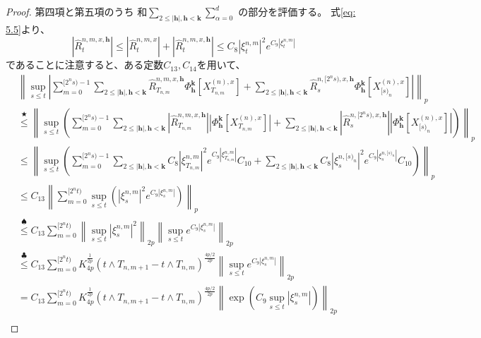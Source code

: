 \documentclass[uplatex]{jsarticle}
\theoremstyle{definition}
\begin{document}
\begin{proof}
  第四項と第五項のうち
  和\(\sum_{2\leq |\mathbf{h}| , \mathbf{h} < \mathbf{k}}\sum_{\alpha=0}^d\)
  の部分を評価する。
  式\eqref{eq: 5.5}より、
  \[
  |\hat{R}_t^{n,m,x,\mathbf{h}}| \leq
  |\hat{R}_t^{n,m,x}| + |\hat{R}_t^{n,m,x,\mathbf{h}}| \leq
  C_8|\xi_t^{n,m}|^2e^{C_9|\xi_t^{n,m}|}
  \]
  であることに注意すると、ある定数\(C_{13},C_{14}\)を用いて、
  \begin{align*}
    &\left\| \sup_{s\leq t}
    \left| \sum_{m=0}^{[2^ns)-1}\sum_{2 \leq |\mathbf{h}| , \mathbf{h} < \mathbf{k}}
    \hat{R}_{T_{n,m}}^{n,m,x,\mathbf{h}}
    \Phi_{\mathbf{h}}^{\mathbf{k}}\left[ X_{T_{n,m}}^{(n),x}\right]
    + \sum_{2 \leq |\mathbf{h}| , \mathbf{h} < \mathbf{k}}
    \hat{R}_s^{n,[2^ns),x,\mathbf{h}}
    \Phi_{\mathbf{h}}^{\mathbf{k}}\left[ X_{[s)_n}^{(n),x}\right]
    \right| \right\|_p \\
    &\overset{\bigstar}{\leq} \left\| \sup_{s\leq t} \left(
    \sum_{m=0}^{[2^ns)-1}\sum_{2 \leq |\mathbf{h}| , \mathbf{h} < \mathbf{k}}
    \left| \hat{R}_{T_{n,m}}^{n,m,x,\mathbf{h}}\right|
    \left|
    \Phi_{\mathbf{h}}^{\mathbf{k}}\left[ X_{T_{n,m}}^{(n),x}\right]
    \right|
    + \sum_{2 \leq |\mathbf{h}| , \mathbf{h} < \mathbf{k}}
    \left| \hat{R}_s^{n,[2^ns),x,\mathbf{h}}\right|
    \left|
    \Phi_{\mathbf{h}}^{\mathbf{k}}\left[ X_{[s)_n}^{(n),x}\right]
    \right| \right) \right\|_p \\
    &\leq \left\| \sup_{s\leq t}\left(
    \sum_{m=0}^{[2^ns)-1}\sum_{2 \leq |\mathbf{h}| , \mathbf{h} < \mathbf{k}}
    C_8|\xi_{T_{n,m}}^{n,m}|^2e^{C_9|\xi_{T_{n,m}}^{n,m}|} C_{10}
    + \sum_{2 \leq |\mathbf{h}| , \mathbf{h} < \mathbf{k}}
    C_8|\xi_s^{n,[s)_n}|^2e^{C_9|\xi_s^{n,[s)_n}|} C_{10}
    \right) \right\|_p \\
    &\leq
    C_{13} \left\| \sum_{m=0}^{[2^nt)} \sup_{s\leq t}\left(
    |\xi_s^{n,m}|^2e^{C_9|\xi_s^{n,m}|}\right)\right\|_p \\
    &\overset{\spadesuit}{\leq}
    C_{13} \sum_{m=0}^{[2^nt)}
    \left\| \sup_{s\leq t} |\xi_s^{n,m}|^2\right\|_{2p}
    \left\| \sup_{s\leq t}e^{C_9|\xi_s^{n,m}|}\right\|_{2p} \\
    &\overset{\clubsuit}{\leq}
    C_{13} \sum_{m=0}^{[2^nt)} K_{4p}^{\frac{1}{2p}}
    \left( t\wedge T_{n,m+1} - t\wedge T_{n,m}\right)^{\frac{4p/2}{2p}}
    \left\| \sup_{s\leq t}e^{C_9|\xi_s^{n,m}|}\right\|_{2p} \\
    &=
    C_{13} \sum_{m=0}^{[2^nt)} K_{4p}^{\frac{1}{2p}}
    \left( t\wedge T_{n,m+1} - t\wedge T_{n,m}\right)^{\frac{4p/2}{2p}}
    \left\| \exp\left( C_9 \sup_{s\leq t} |\xi_s^{n,m}| \right)\right\|_{2p} \\

\end{align*}
\end{proof}
\end{document}
